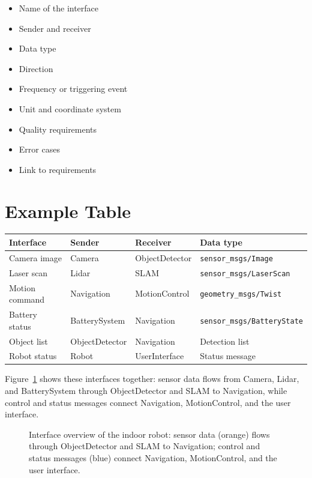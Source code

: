 \begin{itemize}
    \item Name of the interface
    \item Sender and receiver
    \item Data type
    \item Direction
    \item Frequency or triggering event
    \item Unit and coordinate system
    \item Quality requirements
    \item Error cases
    \item Link to requirements
\end{itemize}

\section{Example Table}
\begingroup
\small
\setlength{\tabcolsep}{3pt}
\begin{longtable}{@{}p{}p{}p{}p{}@{}}
\toprule
Interface & Sender & Receiver & Data type\\
\midrule
Camera image & Camera & ObjectDetector & \texttt{sensor\_msgs/}\newline\texttt{Image}\\
Laser scan & Lidar & SLAM & \texttt{sensor\_msgs/}\newline\texttt{LaserScan}\\
Motion command & Navigation & MotionControl & \texttt{geometry\_msgs/}\newline\texttt{Twist}\\
Battery status & BatterySystem & Navigation & \texttt{sensor\_msgs/}\newline\texttt{BatteryState}\\
Object list & ObjectDetector & Navigation & Detection list\\
Robot status & Robot & UserInterface & Status message\\
\bottomrule
\end{longtable}
\endgroup

Figure~\ref{fig:kap10-schnittstellenuebersicht} shows these interfaces together: sensor data flows from Camera, Lidar, and BatterySystem through ObjectDetector and SLAM to Navigation, while control and status messages connect Navigation, MotionControl, and the user interface.

\begin{figure}[H]
  \centering
  \caption{Interface overview of the indoor robot: sensor data (orange) flows through ObjectDetector and SLAM to Navigation; control and status messages (blue) connect Navigation, MotionControl, and the user interface.}
  \label{fig:kap10-schnittstellenuebersicht}
\end{figure}

